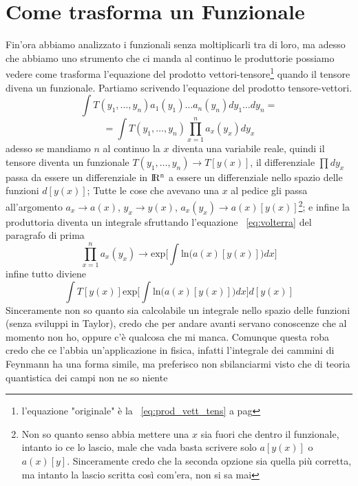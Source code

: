 \documentclass[11pt,a4paper]{report}
\theoremstyle{definition}
\theoremstyle{plain}
\theoremstyle{plain}
\begin{document}
		\section{Come trasforma un Funzionale}
			Fin'ora abbiamo analizzato i funzionali senza moltiplicarli tra di loro, ma adesso che abbiamo uno strumento che ci manda al continuo le produttorie possiamo vedere come trasforma l'equazione del prodotto vettori-tensore\footnote{l'equazione "originale" è la ~\ref{eq:prod_vett_tens} a pag \pageref{eq:prod_vett_tens}} quando il tensore divena un funzionale.\newline
			Partiamo scrivendo l'equazione del prodotto tensore-vettori.
			\begin{equation}
				\int T(y_1,\dots,y_n)a_1(y_1)\dots a_n(y_n)dy_1\dots dy_n=
			\end{equation}
			\[
				=\int T(y_1,\dots,y_n)\prod_{x=1}^n a_x(y_x)dy_x
			\]
			adesso se mandiamo $n$ al continuo la $x$ diventa una variabile reale, quindi il tensore diventa un funzionale $T(y_1,\dots,y_n)\rightarrow T[y(x)]$, il differenziale $\prod dy_x$ passa da essere un differenziale in $\rm I\!R^n$ a essere un differenziale nello spazio delle funzioni $d[y(x)]$;\newline
			Tutte le cose che avevano una $x$ al pedice gli passa all'argomento $a_x\rightarrow a(x)$, $y_x\rightarrow y(x)$, $a_x(y_x)\rightarrow a(x)[y(x)]$\footnote{Non so quanto senso abbia mettere una $x$ sia fuori che dentro il funzionale, intanto io ce lo lascio, male che vada basta scrivere solo $a[y(x)]$ o $a(x)[y]$. Sinceramente credo che la seconda opzione sia quella più corretta, ma intanto la lascio scritta così com'era, non si sa mai}; e infine la produttoria diventa un integrale sfruttando l'equazione ~\ref{eq:volterra} del paragrafo di prima 
			\[
				\prod_{x=1}^n a_x(y_x)\rightarrow\textrm{exp}\bigg[\int \textrm{ln}\big(a(x)[y(x)]\big)dx\bigg]
			\]
			infine tutto diviene
			\begin{equation}
				\int T[y(x)]\textrm{exp}\bigg[\int \textrm{ln}\big(a(x)[y(x)]\big)dx\bigg]d[y(x)]
			\end{equation}
			Sinceramente non so quanto sia calcolabile un integrale nello spazio delle funzioni (senza sviluppi in Taylor), credo che per andare avanti servano conoscenze che al momento non ho, oppure c'è qualcosa che mi manca.\newline
			Comunque questa roba credo che ce l'abbia un'applicazione in fisica, infatti l'integrale dei cammini di Feynmann ha una forma simile, ma preferisco non sbilanciarmi visto che di teoria quantistica dei campi non ne so niente
\end{document}
